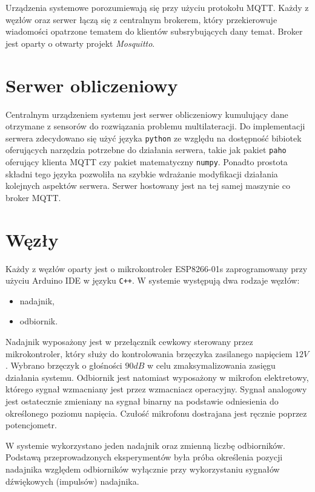 Urządzenia systemowe porozumiewają się przy użyciu protokołu MQTT. Każdy z węzłów oraz serwer łączą się z centralnym brokerem, który przekierowuje wiadomości opatrzone tematem do klientów subsrybujących dany temat. Broker jest oparty o otwarty projekt \textit{Mosquitto}.

\section{Serwer obliczeniowy}

Centralnym urządzeniem systemu jest serwer obliczeniowy kumulujący dane otrzymane z sensorów do rozwiązania problemu multilateracji. Do implementacji serwera zdecydowano się użyć języka \texttt{python} ze względu na dostępność bibiotek oferujących narzędzia potrzebne do działania serwera, takie jak pakiet \texttt{paho} oferujący klienta MQTT czy pakiet matematyczny \texttt{numpy}. Ponadto prostota składni tego języka pozwoliła na szybkie wdrażanie modyfikacji działania kolejnych aspektów serwera. Serwer hostowany jest na tej samej maszynie co broker MQTT.

\section{Węzły}

Każdy z węzłów oparty jest o mikrokontroler ESP8266-01s zaprogramowany przy użyciu Arduino IDE w języku \texttt{C++}. W systemie występują dwa rodzaje węzłów:
\begin{itemize}
  \item nadajnik,
  \item odbiornik.
\end{itemize}
Nadajnik wyposażony jest w przełącznik cewkowy sterowany przez mikrokontroler, który służy do kontrolowania brzęczyka zasilanego napięciem $12V$. Wybrano brzęczyk o głośności $90dB$ w celu zmaksymalizowania zasięgu działania systemu. Odbiornik jest natomiast wyposażony w mikrofon elektretowy, którego sygnał wzmacniany jest przez wzmacniacz operacyjny. Sygnał analogowy jest ostatecznie zmieniany na sygnał binarny na podstawie odniesienia do określonego poziomu napięcia. Czułość mikrofonu dostrajana jest ręcznie poprzez potencjometr. 

W systemie wykorzystano jeden nadajnik oraz zmienną liczbę odbiorników. Podstawą przeprowadzonych eksperymentów była próba określenia pozycji nadajnika względem odbiorników wyłącznie przy wykorzystaniu sygnałów dźwiękowych (impulsów) nadajnika.